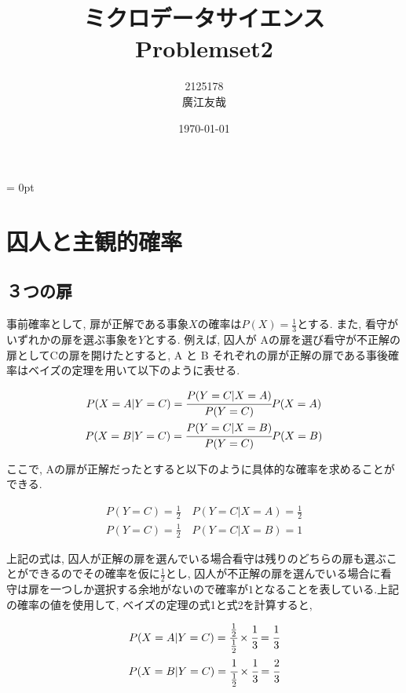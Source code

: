 \documentclass{article}
\begin{document}
\parindent = 0pt

\title{ミクロデータサイエンス\\Problemset2}
\author{2125178\\廣江友哉}
\date{\today}
\maketitle


\section{囚人と主観的確率}

\subsection{３つの扉}

事前確率として, 扉が正解である事象$X$の確率は$P(X) = \frac{1}{3}$とする. また, 看守がいずれかの扉を選ぶ事象を$Y$とする. 例えば, 囚人が Aの扉を選び看守が不正解の扉としてCの扉を開けたとすると, A と B それぞれの扉が正解の扉である事後確率はベイズの定理を用いて以下のように表せる.

\begin{center}
	\begin{gather}
		P(X = A | Y = C) = \cfrac{P(Y = C | X = A)}{P(Y = C)} P(X = A) \\
		P(X = B | Y = C) = \cfrac{P(Y = C | X = B)}{P(Y = C)} P(X = B)
	\end{gather}
\end{center}

ここで, Aの扉が正解だったとすると以下のように具体的な確率を求めることができる.

\begin{center}
	\begin{gather}
		P(Y = C) = \frac{1}{2}\quad P(Y = C | X = A) = \frac{1}{2} \\
		P(Y = C) = \frac{1}{2}\quad P(Y = C | X = B) = 1
	\end{gather}
\end{center}

上記の式は, 囚人が正解の扉を選んでいる場合看守は残りのどちらの扉も選ぶことができるのでその確率を仮に$\frac{1}{2}$とし, 囚人が不正解の扉を選んでいる場合に看守は扉を一つしか選択する余地がないので確率が$1$となることを表している.上記の確率の値を使用して, ベイズの定理の式1と式2を計算すると,

\begin{center}
	\begin{gather}
		P(X = A | Y = C) = \cfrac{\frac{1}{2}}{\frac{1}{2}} \times \cfrac{1}{3} = \cfrac{1}{3} \\
		P(X = B | Y = C) = \cfrac{1}{\frac{1}{2}} \times \cfrac{1}{3} = \cfrac{2}{3}
	\end{gather}
\end{center}
\end{document}
